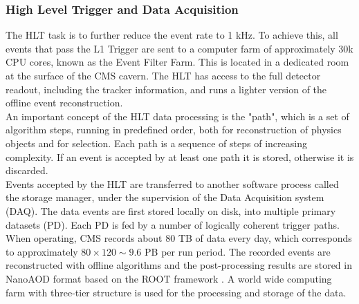\subsubsection{\label{sec:exp_CMS_trigger_2}High Level Trigger and Data Acquisition}
\noindent The HLT task is to further reduce the event rate to 1 kHz. To achieve this, all events that pass the L1 Trigger are sent to a computer farm of approximately 30k CPU cores, known as the Event Filter Farm. This is located in a dedicated room at the surface of the CMS cavern. The HLT has access to the full detector readout, including the tracker information, and runs a lighter version of the offline event reconstruction.\\
\indent An important concept of the HLT data processing is the "path", which is a set of algorithm steps, running in predefined order, both for reconstruction of physics objects and for selection. Each path is a sequence of steps of increasing complexity. If an event is accepted by at least one path it is stored, otherwise it is discarded.\\
\indent Events accepted by the HLT are transferred to another software process called the storage manager, under the supervision of the Data Acquisition system (DAQ). The data events are first stored locally on disk, into multiple primary datasets (PD). Each PD is fed by a number of logically coherent trigger paths. When operating, CMS records about 80 TB of data every day, which corresponds to approximately $ 80 \times 120 \sim 9.6$ PB per run period. The recorded events are reconstructed with offline algorithms and the post-processing results are stored in NanoAOD format based on the ROOT framework \cite{Peruzzi_2020}. A world wide computing farm with three-tier structure is used for the processing and storage of the data.

